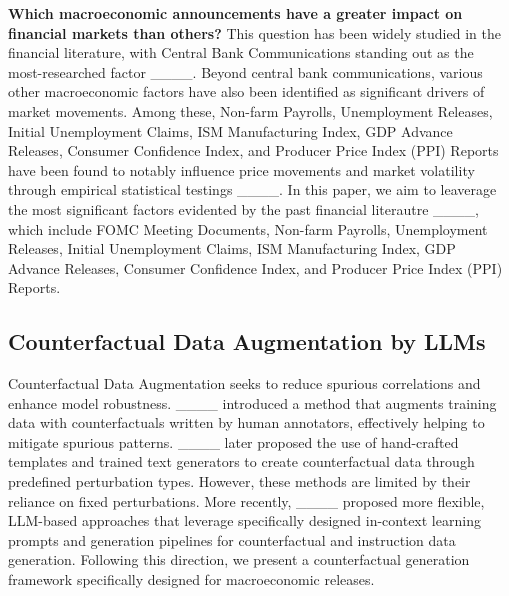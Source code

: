 \textbf{Which macroeconomic announcements have a greater impact on financial markets than others?} This question has been widely studied in the financial literature, with Central Bank Communications standing out as the most-researched factor ____. Beyond central bank communications, various other macroeconomic factors have also been identified as significant drivers of market movements. Among these, Non-farm Payrolls, Unemployment Releases, Initial Unemployment Claims, ISM Manufacturing Index, GDP Advance Releases, Consumer Confidence Index, and Producer Price Index (PPI) Reports have been found to notably influence price movements and market volatility through empirical statistical testings ____. In this paper, we aim to leaverage the most significant factors evidented by the past financial literautre ____, which include FOMC Meeting Documents, Non-farm Payrolls, Unemployment Releases, Initial Unemployment Claims, ISM Manufacturing Index, GDP Advance Releases, Consumer Confidence Index, and Producer Price Index (PPI) Reports.

\subsection{Counterfactual Data Augmentation by LLMs} 

Counterfactual Data Augmentation seeks to reduce spurious correlations and enhance model robustness. ____ introduced a method that augments training data with counterfactuals written by human annotators, effectively helping to mitigate spurious patterns. ____ later proposed the use of hand-crafted templates and trained text generators to create counterfactual data through predefined perturbation types. However, these methods are limited by their reliance on fixed perturbations. More recently, ____ proposed more flexible, LLM-based approaches that leverage specifically designed in-context learning prompts and generation pipelines for counterfactual and instruction data generation. Following this direction, we present a counterfactual generation framework specifically designed for macroeconomic releases.






